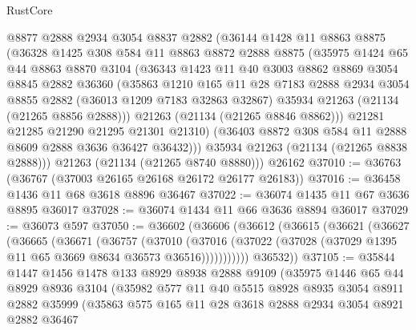\begin{lexlean}{RustCore}
\begin{coremodule}
        @8877
        @2888
        @2934
        @3054
        @8837
        @2882
        (@36144
          @1428
          @11
          @8863
          @8875
          (@36328
            @1425
            @308
            @584
            @11
            @8863
            @8872
            @2888
            @8875
            (@35975
              @1424
              @65
              @44
              @8863
              @8870
              @3104
              (@36343
                @1423
                @11
                @40
                @3003
                @8862
                @8869
                @3054
                @8845
                @2882
                @36360
                (@35863
                  @1210
                  @165
                  @11
                  @28
                  @7183
                  @2888
                  @2934
                  @3054
                  @8855
                  @2882
                  (@36013 @1209 @7183 @32863 @32867)
                  @35934
                  @21263
                  (@21134 (@21265 @8856 @2888)))
                @21263
                (@21134 (@21265 @8846 @8862)))
              @21281
              @21285
              @21290
              @21295
              @21301
              @21310)
            (@36403 @8872 @308 @584 @11 @2888 @8609 @2888 @3636 @36427 @36432)))
        @35934
        @21263
        (@21134 (@21265 @8838 @2888)))
      @21263
      (@21134 (@21265 @8740 @8880)))
    @26162
@37010 := @36763 (@36767 (@37003 @26165 @26168 @26172 @26177 @26183))
@37016 := @36458 @1436 @11 @68 @3618 @8896 @36467
@37022 := @36074 @1435 @11 @67 @3636 @8895 @36017
@37028 := @36074 @1434 @11 @66 @3636 @8894 @36017
@37029 := @36073 @597
@37050 := @36602
    (@36606
      (@36612
        (@36615
          (@36621
            (@36627
              (@36665
                (@36671
                  (@36757
                    (@37010
                      (@37016
                        (@37022 (@37028 (@37029 @1395 @11 @65 @3669 @8634 @36573 @36516)))))))))))
        @36532))
@37105 := @35844
    @1447
    @1456
    @1478
    @133
    @8929
    @8938
    @2888
    @9109
    (@35975
      @1446
      @65
      @44
      @8929
      @8936
      @3104
      (@35982
        @577
        @11
        @40
        @5515
        @8928
        @8935
        @3054
        @8911
        @2882
        @35999
        (@35863
          @575
          @165
          @11
          @28
          @3618
          @2888
          @2934
          @3054
          @8921
          @2882
          @36467

\end{coremodule}
\end{lexlean}
